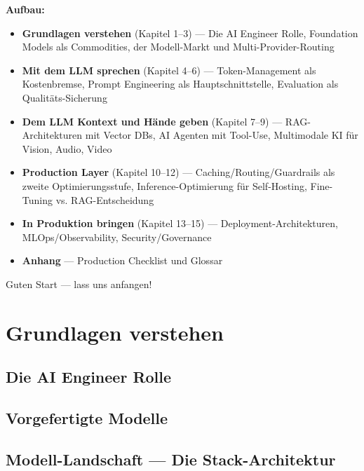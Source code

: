 \documentclass[
  12pt,
  twoside,
  openany,
  headings=big,
  numbers=noenddot,
  parskip=half,
  DIV=12
]{scrbook}
\begin{document}
\textbf{Aufbau:}

\begin{itemize}
      \item \textbf{Grundlagen verstehen} (Kapitel 1--3) --- Die AI Engineer Rolle, Foundation Models als Commodities, der Modell-Markt und Multi-Provider-Routing
      \item \textbf{Mit dem LLM sprechen} (Kapitel 4--6) --- Token-Management als Kostenbremse, Prompt Engineering als Hauptschnittstelle, Evaluation als Qualitäts-Sicherung
      \item \textbf{Dem LLM Kontext und Hände geben} (Kapitel 7--9) --- RAG-Architekturen mit Vector DBs, AI Agenten mit Tool-Use, Multimodale KI für Vision, Audio, Video
      \item \textbf{Production Layer} (Kapitel 10--12) --- Caching/Routing/Guardrails als zweite Optimierungsstufe, Inference-Optimierung für Self-Hosting, Fine-Tuning vs. RAG-Entscheidung
      \item \textbf{In Produktion bringen} (Kapitel 13--15) --- Deployment-Architekturen, MLOps/Observability, Security/Governance
      \item \textbf{Anhang} --- Production Checklist und Glossar
\end{itemize}

Guten Start --- lass uns anfangen!

\mainmatter

\part{Grundlagen verstehen}

\chapter{Die AI Engineer Rolle}


\chapter{Vorgefertigte Modelle}


\chapter{Modell-Landschaft --- Die Stack-Architektur}

\end{document}
